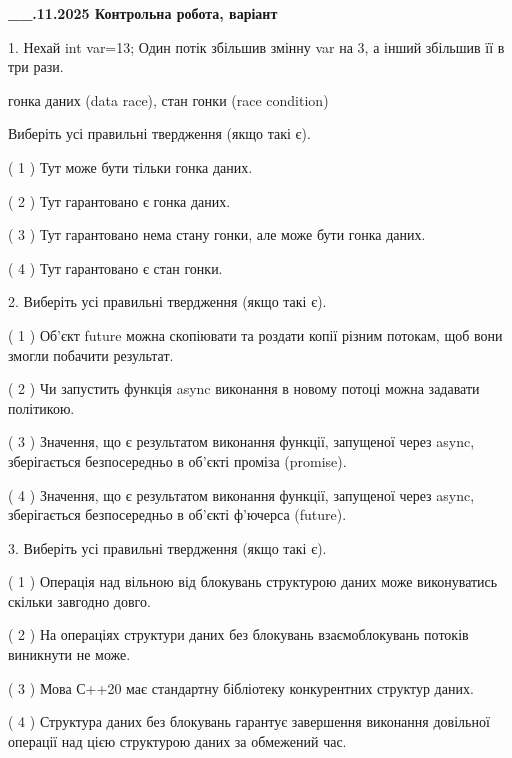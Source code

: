 \documentclass[12pt, ukrainian]{article}
\begin{document}
\newpage
\begin {large}

\textbf{\_\_.11.2025 Контрольна робота, варіант  }\par


{
1. Нехай int var=13; Один потік збільшив змінну var на 3, а інший збільшив її в три рази.

гонка даних (data race), стан гонки (race condition)

Виберіть усі правильні твердження (якщо такі є).\par
\vspace{2mm}
( 1 ) Тут може бути тільки гонка даних.%

( 2 ) Тут гарантовано є гонка даних.%

( 3 ) Тут гарантовано нема стану гонки, але може бути гонка даних.%

( 4 ) Тут гарантовано є стан гонки.%


2. Виберіть усі правильні твердження (якщо такі є).\par
\vspace{2mm}

( 1 ) Об’єкт future можна скопіювати та роздати копії різним потокам, щоб вони змогли побачити результат.%

( 2 ) Чи запустить функція  async виконання в новому потоці можна задавати політикою.%

( 3 ) Значення, що є результатом виконання функції, запущеної через async, зберігається безпосередньо в об’єкті проміза (promise).%

( 4 ) Значення, що є результатом виконання функції, запущеної через async, зберігається безпосередньо в об’єкті ф’ючерса (future).%


3. Виберіть усі правильні твердження (якщо такі є).\par
\vspace{2mm}

( 1 ) Операція над вільною від блокувань структурою даних може виконуватись скільки завгодно довго.%

( 2 ) На операціях структури даних без блокувань взаємоблокувань потоків виникнути не може.%

( 3 ) Мова С++20 має стандартну бібліотеку конкурентних структур даних.%

( 4 ) Структура даних без блокувань гарантує завершення виконання довільної операції над цією структурою даних за обмежений час.%


}
\end{large}
\end{document}
